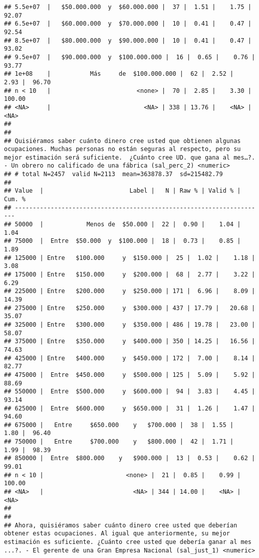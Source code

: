 \documentclass[
  10,
  landscape,
  legalpaper]{article}
\begin{document}
\begin{verbatim}
## 5.5e+07  |   $50.000.000  y  $60.000.000 |  37 |  1.51 |    1.75 |  92.07
## 6.5e+07  |   $60.000.000  y  $70.000.000 |  10 |  0.41 |    0.47 |  92.54
## 8.5e+07  |   $80.000.000  y  $90.000.000 |  10 |  0.41 |    0.47 |  93.02
## 9.5e+07  |   $90.000.000  y  $100.000.000 |  16 |  0.65 |    0.76 |  93.77
## 1e+08    |           Más     de  $100.000.000 |  62 |  2.52 |    2.93 |  96.70
## n < 10   |                        <none> |  70 |  2.85 |    3.30 | 100.00
## <NA>     |                          <NA> | 338 | 13.76 |    <NA> |   <NA>
## 
## 
## Quisiéramos saber cuánto dinero cree usted que obtienen algunas ocupaciones. Muchas personas no están seguras al respecto, pero su mejor estimación será suficiente.  ¿Cuánto cree UD. que gana al mes…?. - Un obrero no calificado de una fábrica (sal_perc_2) <numeric>
## # total N=2457  valid N=2113  mean=363878.37  sd=215482.79
## 
## Value  |                        Label |   N | Raw % | Valid % | Cum. %
## ----------------------------------------------------------------------
## 50000  |            Menos de  $50.000 |  22 |  0.90 |    1.04 |   1.04
## 75000  |  Entre  $50.000  y  $100.000 |  18 |  0.73 |    0.85 |   1.89
## 125000 | Entre   $100.000     y  $150.000 |  25 |  1.02 |    1.18 |   3.08
## 175000 | Entre   $150.000     y  $200.000 |  68 |  2.77 |    3.22 |   6.29
## 225000 | Entre   $200.000     y  $250.000 | 171 |  6.96 |    8.09 |  14.39
## 275000 | Entre   $250.000     y  $300.000 | 437 | 17.79 |   20.68 |  35.07
## 325000 | Entre   $300.000     y  $350.000 | 486 | 19.78 |   23.00 |  58.07
## 375000 | Entre   $350.000     y  $400.000 | 350 | 14.25 |   16.56 |  74.63
## 425000 | Entre   $400.000     y  $450.000 | 172 |  7.00 |    8.14 |  82.77
## 475000 |  Entre  $450.000     y  $500.000 | 125 |  5.09 |    5.92 |  88.69
## 550000 |  Entre  $500.000     y  $600.000 |  94 |  3.83 |    4.45 |  93.14
## 625000 |  Entre  $600.000     y  $650.000 |  31 |  1.26 |    1.47 |  94.60
## 675000 |   Entre     $650.000    y   $700.000 |  38 |  1.55 |    1.80 |  96.40
## 750000 |   Entre     $700.000    y   $800.000 |  42 |  1.71 |    1.99 |  98.39
## 850000 |  Entre  $800.000    y   $900.000 |  13 |  0.53 |    0.62 |  99.01
## n < 10 |                       <none> |  21 |  0.85 |    0.99 | 100.00
## <NA>   |                         <NA> | 344 | 14.00 |    <NA> |   <NA>
## 
## 
## Ahora, quisiéramos saber cuánto dinero cree usted que deberían obtener estas ocupaciones. Al igual que anteriormente, su mejor estimación es suficiente. ¿Cuánto cree usted que debería ganar al mes ...?. - El gerente de una Gran Empresa Nacional (sal_just_1) <numeric>

\end{verbatim}
\end{document}
